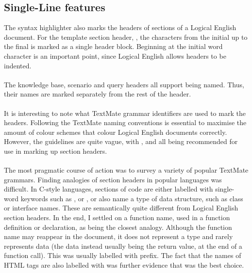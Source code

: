 \documentclass[../main.tex]{subfiles}
\begin{document}
\subsection{Single-Line features}
The syntax highlighter also marks the headers of sections of a Logical English document. For the template section header, , the characters from the initial  up to the final  is marked as a single header block. Beginning at the initial word character is an important point, since Logical English allows headers to be indented. 
\\ 
\\
The knowledge base, scenario and query headers all support being named. Thus, their names are marked separately from the rest of the header. 
\\ 
\\
It is interesting to note what TextMate grammar identifiers are used to mark the headers. Following the TextMate naming conventions \cite{textmate_grammars_spec} is essential to maximise the amount of colour schemes that colour Logical English documents correctly. However, the guidelines are quite vague, with ,  and  all being recommended for use in marking up section headers. 
\\ 
\\
The most pragmatic course of action was to survey a variety of popular TextMate grammars. Finding analogies of section headers in popular languages was difficult. In C-style languages, sections of code are either labelled with single-word keywords such as ,  or , or also name a type of data structure, such as class or interface names. These are semantically quite different from Logical English section headers. In the end, I settled on a function name, used in a function definition or declaration, as being the closest analogy. Although the function name may reappear in the document, it does not represent a type and rarely represents data (the data instead usually being the return value, at the end of a function call). This was usually labelled with  prefix. The fact that the names of HTML tags are also labelled with  was further evidence that  was the best choice. 
\end{document}
